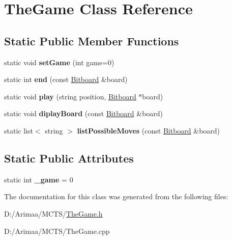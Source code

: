 \hypertarget{class_the_game}{\section{The\+Game Class Reference}
\label{class_the_game}
}
\subsection*{Static Public Member Functions}
\begin{DoxyCompactItemize}
\item 
\hypertarget{class_the_game_aa6976d3d476e693197e17195f183c7e1}{static void {\bfseries set\+Game} (int game=0)}\label{class_the_game_aa6976d3d476e693197e17195f183c7e1}

\item 
\hypertarget{class_the_game_ad6912df0b7ba94d1e4fae858bcbe8c5f}{static int {\bfseries end} (const \hyperlink{class_bitboard}{Bitboard} \&board)}\label{class_the_game_ad6912df0b7ba94d1e4fae858bcbe8c5f}

\item 
\hypertarget{class_the_game_a069ebae2348c1915ef06f5914f89de54}{static void {\bfseries play} (string position, \hyperlink{class_bitboard}{Bitboard} $\ast$board)}\label{class_the_game_a069ebae2348c1915ef06f5914f89de54}

\item 
\hypertarget{class_the_game_a870712ba689cf1c3ce66b9ed709b8bb6}{static void {\bfseries diplay\+Board} (const \hyperlink{class_bitboard}{Bitboard} \&board)}\label{class_the_game_a870712ba689cf1c3ce66b9ed709b8bb6}

\item 
\hypertarget{class_the_game_a5208b9a89c886eea0efd88670e1a45b5}{static list$<$ string $>$ {\bfseries list\+Possible\+Moves} (const \hyperlink{class_bitboard}{Bitboard} \&board)}\label{class_the_game_a5208b9a89c886eea0efd88670e1a45b5}

\end{DoxyCompactItemize}
\subsection*{Static Public Attributes}
\begin{DoxyCompactItemize}
\item 
\hypertarget{class_the_game_ab9f0fa21c6805ac4963cb79633f02c98}{static int {\bfseries \+\_\+game} = 0}\label{class_the_game_ab9f0fa21c6805ac4963cb79633f02c98}

\end{DoxyCompactItemize}


The documentation for this class was generated from the following files\+:\begin{DoxyCompactItemize}
\item 
D\+:/\+Arimaa/\+M\+C\+T\+S/\hyperlink{_the_game_8h}{The\+Game.\+h}\item 
D\+:/\+Arimaa/\+M\+C\+T\+S/The\+Game.\+cpp\end{DoxyCompactItemize}
